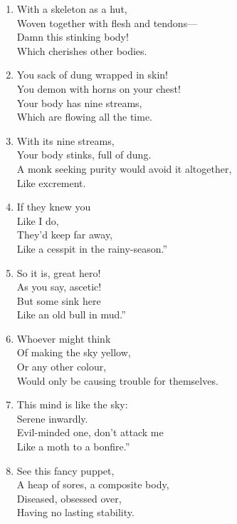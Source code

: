 \documentclass[10pt, openany]{book}
\newcommand*{\vleftofline}[1]{\leavevmode\llap{#1}}
\begin{document}
\begin{enumerate}
\item \vleftofline{“}With a skeleton as a hut,\\
Woven together with flesh and tendons—\\
Damn this stinking body!\\
Which cherishes other bodies.

\item You sack of dung wrapped in skin!\\
You demon with horns on your chest!\\
Your body has nine streams,\\
Which are flowing all the time.

\item With its nine streams,\\
Your body stinks, full of dung.\\
A monk seeking purity would avoid it altogether,\\
Like excrement.

\item If they knew you\\
Like I do,\\
They’d keep far away,\\
Like a cesspit in the rainy-season.”

\item \vleftofline{“}So it is, great hero!\\
As you say, ascetic!\\
But some sink here\\
Like an old bull in mud.”

\item \vleftofline{“}Whoever might think\\
Of making the sky yellow,\\
Or any other colour,\\
Would only be causing trouble for themselves.

\item This mind is like the sky:\\
Serene inwardly.\\
Evil-minded one, don’t attack me\\
Like a moth to a bonfire.”

\item \vleftofline{“}See this fancy puppet,\\
A heap of sores, a composite body,\\
Diseased, obsessed over,\\
Having no lasting stability.


\end{enumerate}
\end{document}
